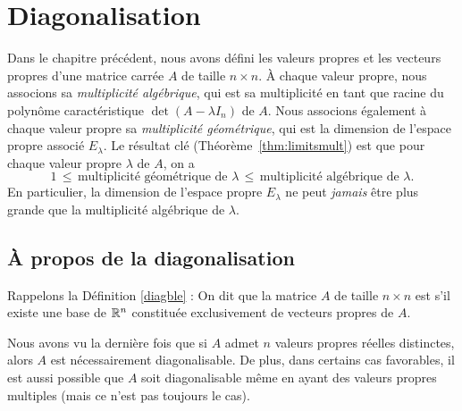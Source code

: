 \chapter{Diagonalisation}
\label{chapter:Fr_27-diag}
 
Dans le chapitre précédent, nous avons défini les valeurs propres et les vecteurs propres d'une matrice carrée $A$ de taille $n\times n$.  À chaque valeur propre, nous associons sa \emph{multiplicité algébrique}, qui est sa multiplicité en tant que racine du polynôme caractéristique $\det(A-\lambda I_n)$ de $A$.  Nous associons également à chaque valeur propre sa \emph{multiplicité géométrique}, qui est la dimension de l'espace propre associé $E_\lambda$.  Le résultat clé (Théorème~\ref{thm:limitsmult}) est que pour chaque valeur propre $\lambda$ de $A$, on a
$$
1\, \leq\, \text{multiplicité géométrique de $\lambda$}\, \leq\,
\text{multiplicité algébrique de $\lambda$}.
$$
En particulier, la dimension de l'espace propre $E_\lambda$ ne peut \emph{jamais} être plus grande que la multiplicité algébrique de $\lambda$.



\section{À propos de la diagonalisation}\label{section:diag}

Rappelons la Définition \ref{diagble} :
On dit que la matrice $A$ de taille $n\times n$ est  s'il existe 
une base de $\mathbb{R}^n$ constituée exclusivement de vecteurs propres de $A$.
 

Nous avons vu la dernière fois que si $A$ admet $n$ valeurs propres réelles distinctes,
alors $A$ est nécessairement diagonalisable. De plus, dans certains cas favorables, il est aussi possible que  $A$ soit diagonalisable même
 en ayant des valeurs propres multiples (mais ce n'est pas toujours le cas).


